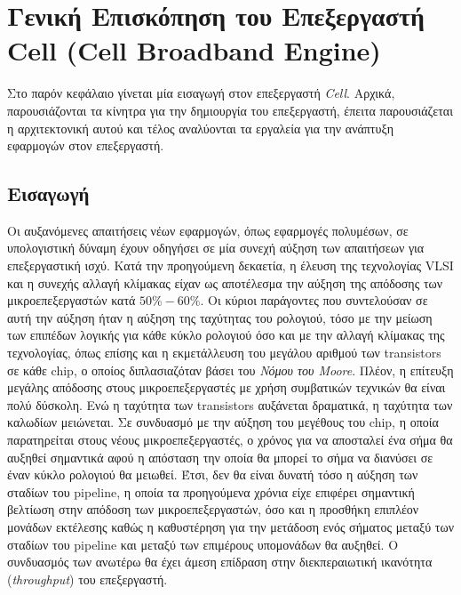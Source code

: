 ﻿\chapter{Γενική Επισκόπηση του Επεξεργαστή Cell (Cell Broadband Engine)}
\label{chapter:chap3}

Στο παρόν κεφάλαιο γίνεται μία εισαγωγή στον επεξεργαστή \textsl{Cell}. Αρχικά, παρουσιάζονται τα κίνητρα για την δημιουργία του επεξεργαστή, έπειτα παρουσιάζεται η αρχιτεκτονική αυτού και τέλος αναλύονται τα εργαλεία για την ανάπτυξη εφαρμογών στον επεξεργαστή.

\section{Εισαγωγή}
\label{section:sect31}
\indent
Οι αυξανόμενες απαιτήσεις νέων εφαρμογών, όπως εφαρμογές πολυμέσων, σε υπολογιστική δύναμη έχουν οδηγήσει σε μία συνεχή αύξηση των απαιτήσεων για επεξεργαστική ισχύ.\newline \indent
Κατά την προηγούμενη δεκαετία, η έλευση της τεχνολογίας \ac{VLSI} και η συνεχής αλλαγή κλίμακας είχαν ως αποτέλεσμα την αύξηση της απόδοσης των μικροεπεξεργαστών κατά \(50\% - 60\%\). Οι κύριοι παράγοντες που συντελούσαν σε αυτή την αύξηση ήταν η αύξηση της ταχύτητας του ρολογιού, τόσο με την μείωση των επιπέδων λογικής για κάθε κύκλο ρολογιού όσο και με την αλλαγή κλίμακας της τεχνολογίας, όπως επίσης και η εκμετάλλευση του μεγάλου αριθμού των transistors σε κάθε chip, ο οποίος διπλασιαζόταν βάσει του \textsl{Νόμου του Moore}.\newline \indent
Πλέον, η επίτευξη μεγάλης απόδοσης στους μικροεπεξεργαστές με χρήση συμβατικών τεχνικών θα είναι πολύ δύσκολη. Ενώ η ταχύτητα των transistors αυξάνεται δραματικά, η ταχύτητα των καλωδίων μειώνεται. Σε συνδυασμό με την αύξηση του μεγέθους του chip, η οποία παρατηρείται στους νέους μικροεπεξεργαστές, ο χρόνος για να αποσταλεί ένα σήμα θα αυξηθεί σημαντικά αφού η απόσταση την οποία θα μπορεί το σήμα να διανύσει σε έναν κύκλο ρολογιού θα μειωθεί. Έτσι, δεν θα είναι δυνατή τόσο η αύξηση των σταδίων του pipeline, η οποία τα προηγούμενα χρόνια είχε επιφέρει σημαντική βελτίωση στην απόδοση των μικροεπεξεργαστών, όσο και η προσθήκη επιπλέον μονάδων εκτέλεσης καθώς η καθυστέρηση για την μετάδοση ενός σήματος μεταξύ των σταδίων του pipeline και μεταξύ των επιμέρους υπομονάδων θα αυξηθεί. Ο συνδυασμός των ανωτέρω θα έχει άμεση επίδραση στην διεκπεραιωτική ικανότητα (\textsl{throughput}) του επεξεργαστή.\newline \indent
